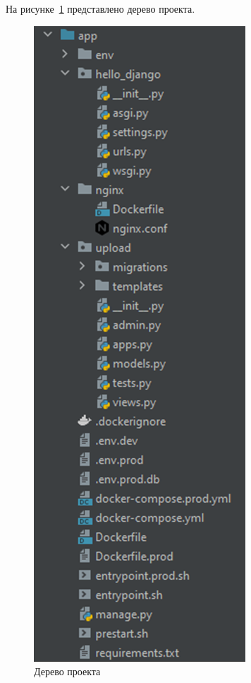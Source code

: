 \def\notedate{2022.11.04}
\def\currentauthor{Василян А.Р. (РК6-73Б)}

На рисунке~\ref{rndhpcgui.2022.11.04.picture1} представлено дерево проекта.
\begin{figure}[!ht]
  \centering
  \includegraphics[scale=0.8]{ResearchNotes/rndhpc_dev_gui_2022_11_04/rndhpcgui.2022.11.04.picture1.png}
  \caption{Дерево проекта}
  \label{rndhpcgui.2022.11.04.picture1}
\end{figure}

